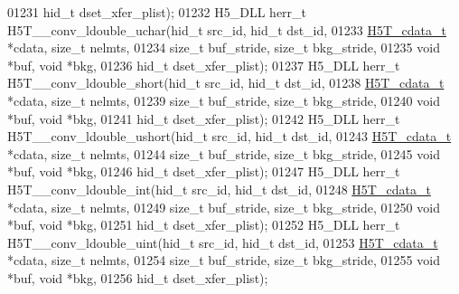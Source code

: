 \begin{DoxyCode}
01231                                      hid\_t dset\_xfer\_plist);
01232 H5\_DLL herr\_t H5T\_\_conv\_ldouble\_uchar(hid\_t src\_id, hid\_t dst\_id,
01233                      \hyperlink{struct_h5_t__cdata__t}{H5T\_cdata\_t} *cdata, \textcolor{keywordtype}{size\_t} nelmts,
01234                      \textcolor{keywordtype}{size\_t} buf\_stride, \textcolor{keywordtype}{size\_t} bkg\_stride,
01235                                      \textcolor{keywordtype}{void} *buf, \textcolor{keywordtype}{void} *bkg,
01236                                      hid\_t dset\_xfer\_plist);
01237 H5\_DLL herr\_t H5T\_\_conv\_ldouble\_short(hid\_t src\_id, hid\_t dst\_id,
01238                      \hyperlink{struct_h5_t__cdata__t}{H5T\_cdata\_t} *cdata, \textcolor{keywordtype}{size\_t} nelmts,
01239                      \textcolor{keywordtype}{size\_t} buf\_stride, \textcolor{keywordtype}{size\_t} bkg\_stride,
01240                                      \textcolor{keywordtype}{void} *buf, \textcolor{keywordtype}{void} *bkg,
01241                                      hid\_t dset\_xfer\_plist);
01242 H5\_DLL herr\_t H5T\_\_conv\_ldouble\_ushort(hid\_t src\_id, hid\_t dst\_id,
01243                      \hyperlink{struct_h5_t__cdata__t}{H5T\_cdata\_t} *cdata, \textcolor{keywordtype}{size\_t} nelmts,
01244                      \textcolor{keywordtype}{size\_t} buf\_stride, \textcolor{keywordtype}{size\_t} bkg\_stride,
01245                                      \textcolor{keywordtype}{void} *buf, \textcolor{keywordtype}{void} *bkg,
01246                                      hid\_t dset\_xfer\_plist);
01247 H5\_DLL herr\_t H5T\_\_conv\_ldouble\_int(hid\_t src\_id, hid\_t dst\_id,
01248                      \hyperlink{struct_h5_t__cdata__t}{H5T\_cdata\_t} *cdata, \textcolor{keywordtype}{size\_t} nelmts,
01249                      \textcolor{keywordtype}{size\_t} buf\_stride, \textcolor{keywordtype}{size\_t} bkg\_stride,
01250                                      \textcolor{keywordtype}{void} *buf, \textcolor{keywordtype}{void} *bkg,
01251                                      hid\_t dset\_xfer\_plist);
01252 H5\_DLL herr\_t H5T\_\_conv\_ldouble\_uint(hid\_t src\_id, hid\_t dst\_id,
01253                      \hyperlink{struct_h5_t__cdata__t}{H5T\_cdata\_t} *cdata, \textcolor{keywordtype}{size\_t} nelmts,
01254                      \textcolor{keywordtype}{size\_t} buf\_stride, \textcolor{keywordtype}{size\_t} bkg\_stride,
01255                                      \textcolor{keywordtype}{void} *buf, \textcolor{keywordtype}{void} *bkg,
01256                                      hid\_t dset\_xfer\_plist);

\end{DoxyCode}
